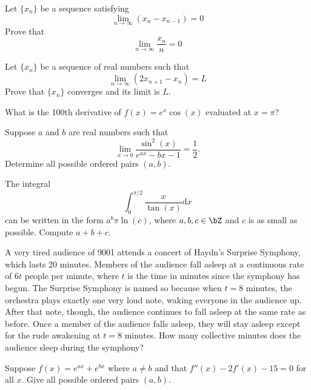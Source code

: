 \documentclass[12pt]{article}
\begin{document}
        \begin{exercise}
            Let $\{x_n\}$ be a sequence satisfying \[\lim_{n\to\infty} (x_n-x_{n-1}) = 0\] Prove that \[\lim_{n\to\infty} \frac{x_n}{n}= 0\]
        \end{exercise}
            
        \begin{exercise}
            Let $\{x_n\}$ be a sequence of real numbers such that \[ \lim_{n\to\infty} (2x_{n+1}-x_n)=L\] Prove that $\{x_n\}$ converges and its limit is $L$.
        \end{exercise}

        \begin{exercise}
            What is the 100th derivative of \(f(x)=e^x\cos(x)\) evaluated at \(x=\pi\)?
        \end{exercise}

        \begin{exercise}
            Suppose \(a\) and \(b\) are real numbers such that 
            \[\lim_{x\to 0}\frac{\sin^2(x)}{e^{ax}-bx-1} = \frac{1}{2}.\]
            Determine all possible ordered pairs \((a,b)\).
        \end{exercise}

        \begin{exercise}
            The integral
            \[\int_0^{\pi/2}\frac{x}{\tan(x)}\mathrm{d}x\]
            can be written in the form \(a^b\pi\ln(c)\), where \(a,b,c\in\bZ\) and \(c\) is as small as possible.
            Compute \(a+b+c\).
        \end{exercise}

        \begin{exercise}
            A very tired audience of 9001 attends a concert of Haydn's Surprise Symphony, which lasts 20 minutes.
            Members of the audience fall asleep at a continuous rate of \(6t\) people per minute, where \(t\) is the time in minutes since the symphony has begun.
            The Surprise Symphony is named so because when \(t=8\) minutes, the orchestra plays exactly one very loud note, waking everyone in the audience up.
            After that note, though, the audience continues to fall asleep at the same rate as before.
            Once a member of the audience falls asleep, they will stay asleep except for the rude awakening at \(t=8\) minutes.
            How many collective minutes does the audience sleep during the symphony?
        \end{exercise}

        \begin{exercise}
            Suppose \(f(x) = e^{ax} + e^{bx}\) where \(a\neq b\) and that \(f''(x)-2f'(x)-15=0\) for all \(x\).
            Give all possible ordered pairs \((a,b)\).
        \end{exercise}
\end{document}
